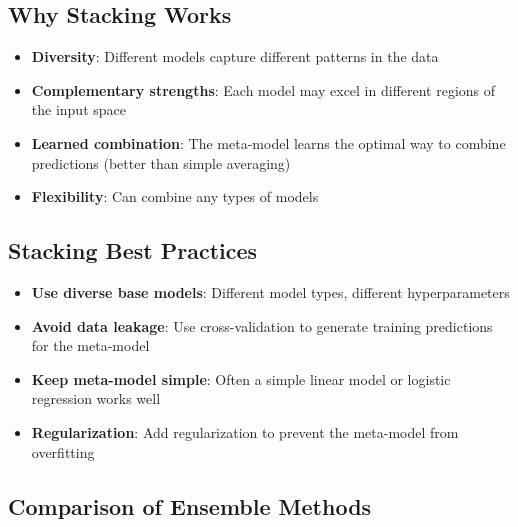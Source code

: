 \documentclass[11pt,a4paper]{article}
\theoremstyle{definition}
\theoremstyle{plain}
\theoremstyle{remark}
\begin{document}
\subsection{Why Stacking Works}

\begin{itemize}
    \item \textbf{Diversity}: Different models capture different patterns in the data
    
    \item \textbf{Complementary strengths}: Each model may excel in different regions of the input space
    
    \item \textbf{Learned combination}: The meta-model learns the optimal way to combine predictions (better than simple averaging)
    
    \item \textbf{Flexibility}: Can combine any types of models
\end{itemize}

\subsection{Stacking Best Practices}

\begin{itemize}
    \item \textbf{Use diverse base models}: Different model types, different hyperparameters
    
    \item \textbf{Avoid data leakage}: Use cross-validation to generate training predictions for the meta-model
    
    \item \textbf{Keep meta-model simple}: Often a simple linear model or logistic regression works well
    
    \item \textbf{Regularization}: Add regularization to prevent the meta-model from overfitting
\end{itemize}

\subsection{Comparison of Ensemble Methods}
\end{document}
